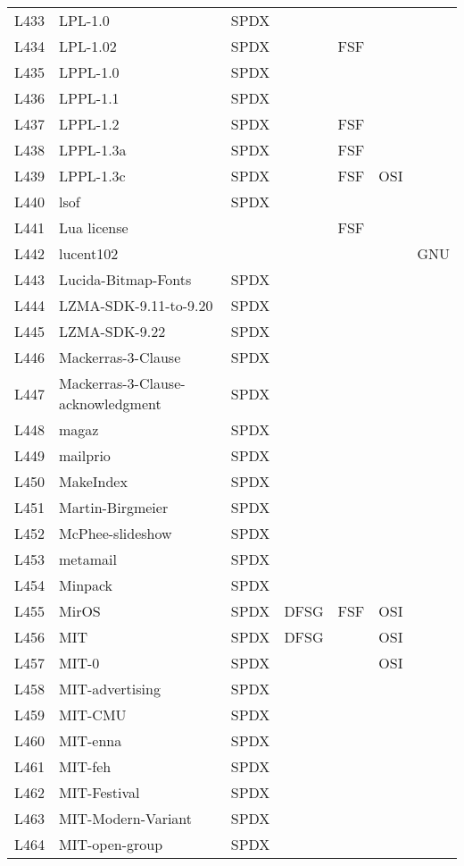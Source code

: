 \begin{longtable}[h]{m{2cm} | m{7cm} | c | c | c | c | c}
  L433 & LPL-1.0 & SPDX &  &  &  &  \\
  L434 & LPL-1.02 & SPDX &  & FSF &  &  \\
  L435 & LPPL-1.0 & SPDX &  &  &  &  \\
  L436 & LPPL-1.1 & SPDX &  &  &  &  \\
  L437 & LPPL-1.2 & SPDX &  & FSF &  &  \\
  L438 & LPPL-1.3a & SPDX &  & FSF &  &  \\
  L439 & LPPL-1.3c & SPDX &  & FSF & OSI &  \\
  L440 & lsof & SPDX &  &  &  &  \\
  L441 & Lua license &  &  & FSF &  &  \\
  L442 & lucent102 &  &  &  &  & GNU \\
  L443 & Lucida-Bitmap-Fonts & SPDX &  &  &  &  \\
  L444 & LZMA-SDK-9.11-to-9.20 & SPDX &  &  &  &  \\
  L445 & LZMA-SDK-9.22 & SPDX &  &  &  &  \\
  L446 & Mackerras-3-Clause & SPDX &  &  &  &  \\
  L447 & Mackerras-3-Clause-acknowledgment & SPDX &  &  &  &  \\
  L448 & magaz & SPDX &  &  &  &  \\
  L449 & mailprio & SPDX &  &  &  &  \\
  L450 & MakeIndex & SPDX &  &  &  &  \\
  L451 & Martin-Birgmeier & SPDX &  &  &  &  \\
  L452 & McPhee-slideshow & SPDX &  &  &  &  \\
  L453 & metamail & SPDX &  &  &  &  \\
  L454 & Minpack & SPDX &  &  &  &  \\
  L455 & MirOS & SPDX & DFSG & FSF & OSI &  \\
  L456 & MIT & SPDX & DFSG &  & OSI &  \\
  L457 & MIT-0 & SPDX &  &  & OSI &  \\
  L458 & MIT-advertising & SPDX &  &  &  &  \\
  L459 & MIT-CMU & SPDX &  &  &  &  \\
  L460 & MIT-enna & SPDX &  &  &  &  \\
  L461 & MIT-feh & SPDX &  &  &  &  \\
  L462 & MIT-Festival & SPDX &  &  &  &  \\
  L463 & MIT-Modern-Variant & SPDX &  &  &  &  \\
  L464 & MIT-open-group & SPDX &  &  &  &  \\

\end{longtable}
